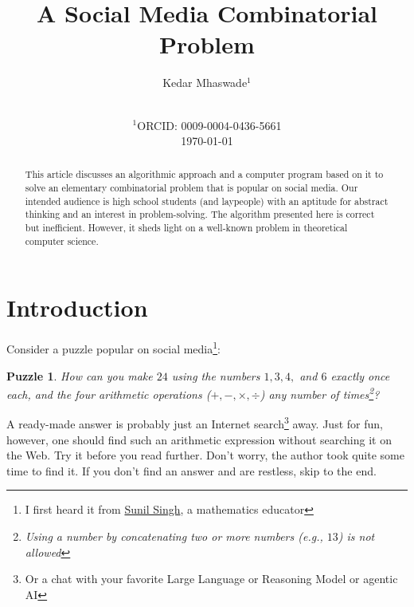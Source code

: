 \documentclass[english,smartquotes]{hgbarticle}
\newtheorem{question}{Puzzle}
\begin{document}

\author{
	Kedar Mhaswade$^1$\\ 
	\\
}
\date{
    $^1$ORCID: 0009-0004-0436-5661\\
    \today
}
\title{A Social Media Combinatorial Problem}

\maketitle

\begin{abstract}\noindent
This article discusses an algorithmic approach and a computer program based on it to solve an elementary combinatorial problem that is popular on social media. Our intended audience is high school students (and laypeople) with an aptitude for abstract thinking and an interest in problem-solving. The algorithm presented here is correct but inefficient. However, it sheds light on a well-known problem in theoretical computer science.
\end{abstract}


\section{Introduction}

Consider a puzzle popular on social media\footnote{I first heard it from \href{https://sunilsingh-42118.medium.com/}{Sunil Singh}, a mathematics educator}:

\begin{question}
\label{puzzle1}
How can you make $24$ using the numbers $1, 3, 4,$ and $6$ exactly once each, and the four arithmetic operations ($+, -, \times, \div$) any number of times\footnote{Using a number by concatenating two or more numbers (e.g., $13$) is not allowed}?
\end{question}

A ready-made answer is probably just an Internet search\footnote{Or a chat with your favorite Large Language or Reasoning Model or agentic AI} away. Just for fun, however, one should find such an arithmetic expression without searching it on the Web. Try it before you read further. Don't worry, the author took quite some time to find it. If you don't find an answer and are restless, skip to the end.
\end{document}
